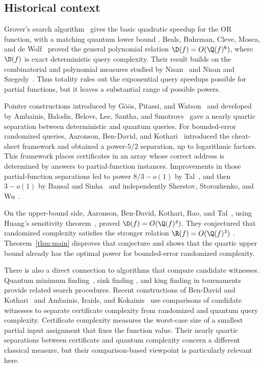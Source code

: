 \subsection{Historical context}

Grover's search algorithm~\cite{Grover96} gives the basic quadratic
speedup for the OR function, with a matching quantum lower bound
\cite{BBBV97}. Beals, Buhrman, Cleve, Mosca, and de Wolf~\cite{BBCMW01}
proved the general polynomial relation $\D(f)=O(\Q(f)^6)$, where
$\D(f)$ is exact deterministic query complexity. Their result builds
on the combinatorial and polynomial measures studied by
Nisan~\cite{Nisan91} and Nisan and Szegedy~\cite{NisanSzegedy94}.
Thus totality rules out the exponential query speedups possible for
partial functions, but it leaves a substantial range of possible powers.

Pointer constructions introduced by G\"o\"os, Pitassi, and
Watson~\cite{GPW15} and developed by Ambainis, Balodis, Belovs, Lee,
Santha, and Smotrovs~\cite{ABBLSS17} gave a nearly quartic separation
between deterministic and quantum queries. For bounded-error randomized
queries, Aaronson, Ben-David, and Kothari~\cite{ABK16} introduced the
cheat-sheet framework and obtained a power-$5/2$ separation, up to
logarithmic factors. This framework places certificates in an array
whose correct address is determined by answers to partial-function
instances. Improvements in those partial-function separations led to
power $8/3-o(1)$ by Tal~\cite{Tal20}, and then $3-o(1)$ by Bansal
and Sinha~\cite{BS21} and independently Sherstov, Storozhenko, and
Wu~\cite{SSW23}.

On the upper-bound side, Aaronson, Ben-David, Kothari, Rao, and
Tal~\cite{ABKRT21}, using Huang's sensitivity theorem~\cite{Huang19},
proved $\D(f)=O(\Q(f)^4)$. They conjectured that randomized complexity
satisfies the stronger relation $\R(f)=O(\Q(f)^3)$
\cite[Conjecture~2]{ABKRT21}. Theorem~\ref{thm:main} disproves that
conjecture and shows that the quartic upper bound already has the
optimal power for bounded-error randomized complexity.

There is also a direct connection to algorithms that compare candidate
witnesses. Quantum minimum finding~\cite{DurrHoyer96}, sink finding
\cite{SYZ04}, and king finding in tournaments~\cite{MPS23} provide
related search procedures. Recent constructions of Ben-David and
Kothari~\cite{BK26} and Ambainis, Iraids, and Kokainis~\cite{AIK26}
use comparisons of candidate witnesses to separate certificate
complexity from randomized and quantum query complexity. Certificate
complexity measures the worst-case size of a smallest partial input
assignment that fixes the function value. Their nearly quartic
separations between certificate and quantum complexity concern a
different classical measure, but their comparison-based viewpoint is
particularly relevant here.

